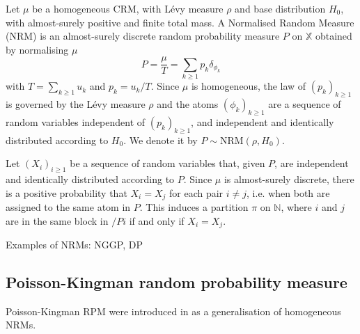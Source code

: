 \begin{definition} \label{def:NRM}
Let $\mu$ be a homogeneous \gls{CRM}, with Lévy measure $\rho$ and base distribution $H_0$, with almost-surely positive and finite total mass. A Normalised Random Measure (NRM) is an almost-surely discrete random probability measure $P$ on $\mathbb{X}$ obtained by normalising $\mu$
$$ P = \frac{\mu}{T} = \sum_{k \ge 1}{p_k \delta_{\phi_k}} $$
with $T = \sum_{k \ge 1}{u_k}$ and $p_k = u_k / T$.
Since $\mu$ is homogeneous, the law of $\left(p_k \right)_{k \ge 1}$ is governed by the Lévy measure $\rho$ and the atoms $\left(\phi_k \right)_{k \ge 1}$ are a sequence of random variables independent of $\left(p_k \right)_{k \ge 1}$, and independent and identically distributed according to $H_0$.
We denote it by $P \sim \text{NRM}(\rho, H_0)$. \\
\end{definition}

Let $(X_i)_{i \ge 1}$ be a sequence of random variables that, given $P$, are independent and identically distributed according to $P$. Since $\mu$ is almost-surely discrete, there is a positive probability that $X_i = X_j$ for each pair $i \neq j$, i.e. when both are assigned to the same atom in $P$. This induces a partition $\pi$ on $\mathbb{N}$, where $i$ and $j$ are in the same block in $/Pi$ if and only if $X_i = X_j$. %

Examples of NRMs: NGGP, DP

\subsection{Poisson-Kingman random probability measure}
Poisson-Kingman \gls{RPM} were introduced in \cite{pitman2003pkp} as a generalisation of homogeneous NRMs. \\

